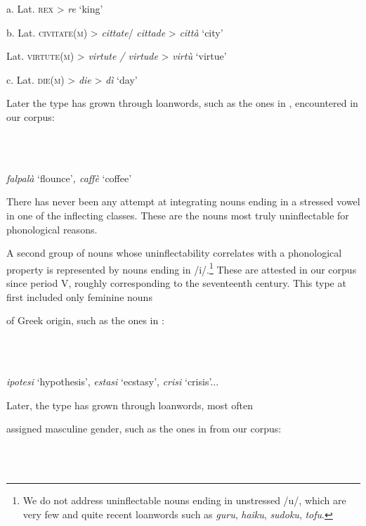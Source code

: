 \documentclass[output=paper]{langscibook}
\begin{document}
          a.   Lat. \textsc{rex} > \textit{re} ‘king’

  b.   Lat. \textsc{civitate(m)} > \textit{cittate}/ \textit{cittade} > \textit{città} ‘city’

    Lat. \textsc{virtute(m)} > \textit{virtute / virtude} > \textit{virtù} ‘virtue’

  c.  Lat. \textsc{die(m)} > \textit{die} > \textit{dì} ‘day’

Later the type has grown through loanwords, such as the ones in , encountered in our corpus:

\ea%
    \label{ex:key:4}
    \gll \\
         \\
    \glt
    \z %

          \textit{falpalà} ‘flounce’\textit{, caffè} ‘coffee’ 

There has never been any attempt at integrating nouns ending in a stressed vowel in one of the inflecting classes. These are the nouns most truly uninflectable for phonological reasons.

A second group of nouns whose uninflectability correlates with a phonological property is represented by nouns ending in /i/.\footnote{We do not address uninflectable nouns ending in unstressed /u/, which are very few and quite recent loanwords such as \textit{guru}, \textit{haiku}, \textit{sudoku}, \textit{tofu}.} These are attested in our corpus since period V, roughly corresponding to the seventeenth century. This type at first included only feminine nouns 

of Greek origin, such as the ones in :

\ea%
    \label{ex:key:5}
    \gll \\
         \\
    \glt
    \z %

          \textit{ipotesi} ‘hypothesis’, \textit{estasi} ‘ecstasy’, \textit{crisi} ‘crisis’...

Later, the type has grown through loanwords, most often 

assigned masculine gender, such as the ones in  from our corpus: 

\ea%
    \label{ex:key:6}
    \gll \\
         \\
    \glt
    \z %
\end{document}
